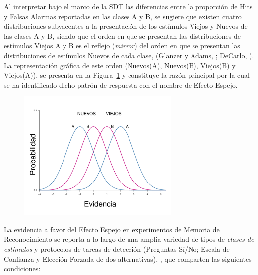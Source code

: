 Al interpretar bajo el marco de la SDT las diferencias entre la proporción de Hits y Falsas Alarmas reportadas en las clases A y B, se sugiere que existen cuatro distribuciones subyacentes a la presentación de los estímulos Viejos y Nuevos de las clases A y B, siendo que el orden en que se presentan las distribuciones de estímulos Viejos A y B es el reflejo (\textit{mirror}) del orden en que se presentan las distribuciones de estímulos Nuevos de cada clase, (Glanzer y Adams, \citeyear{Glanzer1990}; DeCarlo, \citeyear{DeCarlo2007}). La representación gráfica de este orden (Nuevos(A), Nuevos(B), Viejos(B) y Viejos(A)), se presenta en la Figura~\ref{fig:Ejem_EfectoEspejo} y constituye la razón principal por la cual se ha identificado dicho patrón de respuesta con el nombre de Efecto Espejo.\\

\begin{figure}[th]
\centering
\includegraphics[width=0.7\textwidth]{Figures/EfectoEspejo}
\caption[Representación gráfica del Efecto Espejo]{}
\label{fig:Ejem_EfectoEspejo}
\end{figure}

La evidencia a favor del Efecto Espejo en experimentos de Memoria de Reconocimiento se reporta a lo largo de una amplia variedad de tipos de \textit{clases de estímulos} y protocolos de tareas de detección (Preguntas Sí/No; Escala de Confianza y Elección Forzada de dos alternativas), \citep{Glanzer1990}, que comparten las siguientes condiciones:\\

